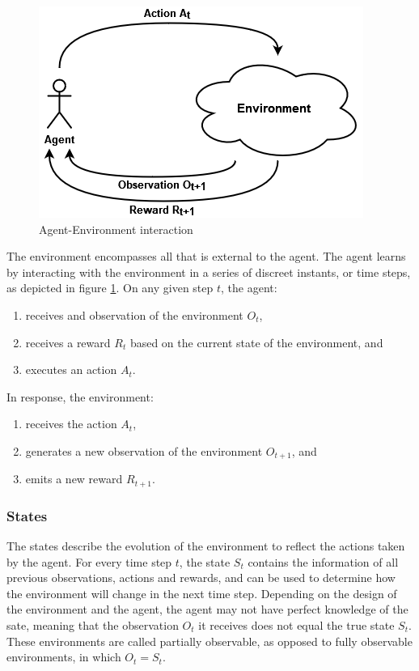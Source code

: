 \begin{figure}[!h]
    \centering
    \includegraphics[width=.5\textwidth]{figs/RL_schema.png}
    \caption{Agent-Environment interaction}
    \label{fig:interaction}
\end{figure}

The environment encompasses all that is external to the agent. The agent learns by interacting with the environment in a series of discreet instants, or time steps, as depicted in figure \ref{fig:interaction}. On any given step $t$, the agent:

\begin{enumerate}
    \item receives and observation of the environment $O_t$,
    \item receives a reward $R_t$ based on the current state of the environment, and
    \item executes an action $A_t$.
\end{enumerate}

In response, the environment:

\begin{enumerate}
    \item receives the action $A_t$,
    \item generates a new observation of the environment $O_{t+1}$, and
    \item emits a new reward $R_{t+1}$.
\end{enumerate}

\subsubsection{States}

The states describe the evolution of the environment to reflect the actions taken by the agent. For every time step $t$, the state $S_t$ contains the information of all previous observations, actions and rewards, and can be used to determine how the environment will change in the next time step. Depending on the design of the environment and the agent, the agent may not have perfect knowledge of the sate, meaning that the observation $O_t$ it receives does not equal the true state $S_t$. These environments are called partially observable, as opposed to fully observable environments, in which $O_t = S_t$.

